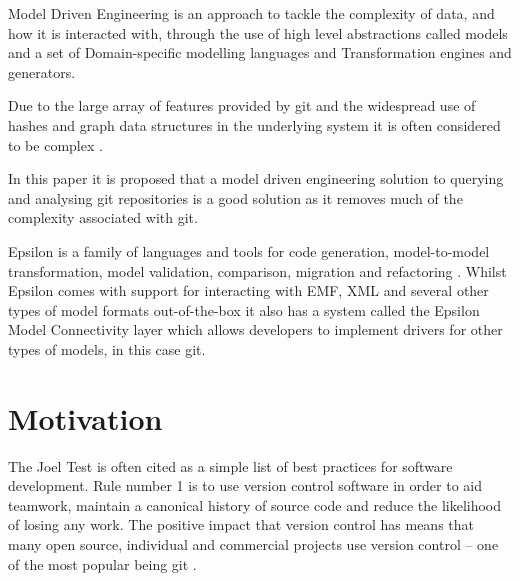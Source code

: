 \documentclass[11pt]{book}
\begin{document}
Model Driven Engineering is an approach to tackle the complexity of data, and how it is interacted with, through the use of high level abstractions called models \cite{modeldrivenengineering} and a set of Domain-specific modelling languages and Transformation engines and generators.   
	
Due to the large array of features provided by git and the widespread use of hashes and graph data structures in the underlying system it is often considered to be complex \cite{gitcomplex}\cite{githard}\cite{gitmixedmetaphors}.

In this paper it is proposed that a model driven engineering solution to querying and analysing git repositories is a good solution as it removes much of the complexity associated with git.


Epsilon is a family of languages and tools for code generation, model-to-model transformation, model validation, comparison, migration and refactoring \cite{epsilonhomepage}. Whilst Epsilon comes with support for interacting with EMF, XML and several other types of model formats out-of-the-box it also has a system called the Epsilon Model Connectivity layer which allows developers to implement drivers for other types of models, in this case git.

\section{Motivation}
The Joel Test \cite{joeltest} is often cited as a simple list of best practices for software development. Rule number 1 is to use version control software in order to aid teamwork, maintain a canonical history of source code and reduce the likelihood of losing any work. The positive impact that version control has means that many open source, individual and commercial projects use version control -- one of the most popular being git \cite{gitpopularity}. 
\end{document}
